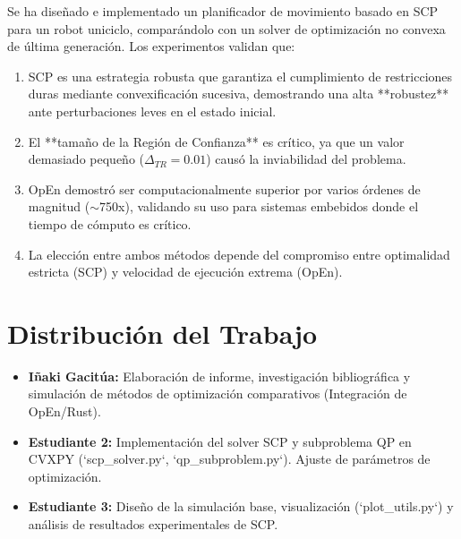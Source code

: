 \documentclass[conference]{IEEEtran}
\begin{document}
Se ha diseñado e implementado un planificador de movimiento basado en SCP para un robot uniciclo, comparándolo con un solver de optimización no convexa de última generación. Los experimentos validan que:
\begin{enumerate}
    \item SCP es una estrategia robusta que garantiza el cumplimiento de restricciones duras mediante convexificación sucesiva, demostrando una alta **robustez** ante perturbaciones leves en el estado inicial.
    \item El **tamaño de la Región de Confianza** es crítico, ya que un valor demasiado pequeño ($\Delta_{TR} = 0.01$) causó la inviabilidad del problema.
    \item OpEn demostró ser computacionalmente superior por varios órdenes de magnitud ($\sim$750x), validando su uso para sistemas embebidos donde el tiempo de cómputo es crítico.
    \item La elección entre ambos métodos depende del compromiso entre optimalidad estricta (SCP) y velocidad de ejecución extrema (OpEn).
\end{enumerate}

\section{Distribución del Trabajo}

\begin{itemize}
    \item \textbf{Iñaki Gacitúa:} Elaboración de informe, investigación bibliográfica y simulación de métodos de optimización comparativos (Integración de OpEn/Rust).
    \item \textbf{Estudiante 2:} Implementación del solver SCP y subproblema QP en CVXPY (`scp\_solver.py`, `qp\_subproblem.py`). Ajuste de parámetros de optimización.
    \item \textbf{Estudiante 3:} Diseño de la simulación base, visualización (`plot\_utils.py`) y análisis de resultados experimentales de SCP.
\end{itemize}
\end{document}
